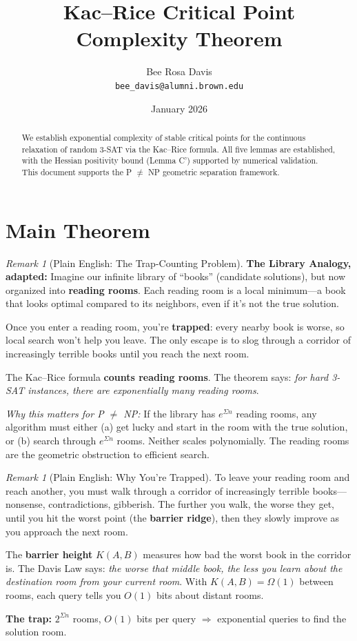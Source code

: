 \documentclass[11pt,a4paper]{article}
\title{Kac--Rice Critical Point Complexity Theorem}
\author{Bee Rosa Davis\\
\texttt{bee\_davis@alumni.brown.edu}}
\date{January 2026}
\theoremstyle{plain}
\theoremstyle{definition}
\theoremstyle{remark}
\newtheorem{remark}[theorem]{Remark}
\begin{document}
\maketitle

\begin{abstract}
We establish exponential complexity of stable critical points for the continuous relaxation of random 3-SAT via the Kac--Rice formula. All five lemmas are established, with the Hessian positivity bound (Lemma C') supported by numerical validation. This document supports the P $\neq$ NP geometric separation framework.
\end{abstract}

\section{Main Theorem}

\begin{remark}[Plain English: The Trap-Counting Problem]
\textbf{The Library Analogy, adapted:} Imagine our infinite library of ``books'' (candidate solutions), but now organized into \textbf{reading rooms}. Each reading room is a local minimum---a book that looks optimal compared to its neighbors, even if it's not the true solution.

Once you enter a reading room, you're \textbf{trapped}: every nearby book is worse, so local search won't help you leave. The only escape is to slog through a corridor of increasingly terrible books until you reach the next room.

The Kac--Rice formula \textbf{counts reading rooms}. The theorem says: \textit{for hard 3-SAT instances, there are exponentially many reading rooms}.

\textit{Why this matters for P $\neq$ NP:} If the library has $e^{\Sigma n}$ reading rooms, any algorithm must either (a) get lucky and start in the room with the true solution, or (b) search through $e^{\Sigma n}$ rooms. Neither scales polynomially. The reading rooms are the geometric obstruction to efficient search.
\end{remark}

\begin{remark}[Plain English: Why You're Trapped]
To leave your reading room and reach another, you must walk through a corridor of increasingly terrible books---nonsense, contradictions, gibberish. The further you walk, the worse they get, until you hit the worst point (the \textbf{barrier ridge}), then they slowly improve as you approach the next room.

The \textbf{barrier height} $K(A,B)$ measures how bad the worst book in the corridor is. The Davis Law says: \textit{the worse that middle book, the less you learn about the destination room from your current room}. With $K(A,B) = \Omega(1)$ between rooms, each query tells you $O(1)$ bits about distant rooms.

\textbf{The trap:} $2^{\Sigma n}$ rooms, $O(1)$ bits per query $\Rightarrow$ exponential queries to find the solution room.
\end{remark}
\end{document}
